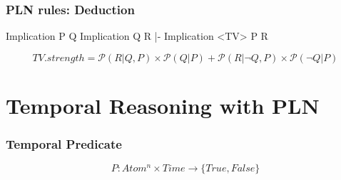\documentclass[aspectratio=169]{beamer}
\begin{document}
\begin{frame}[fragile]

  \frametitle{PLN rules: Deduction}
\begin{semiverbatim}
Implication
  P
  Q
Implication
  Q
  R
|-
Implication <TV>
  P
  R
\end{semiverbatim}
$$TV.strength = \mathcal{P}(R|Q,P)\times\mathcal{P}(Q|P) + \mathcal{P}(R|¬Q,P)\times\mathcal{P}(¬Q|P)$$
\end{frame}

\section {Temporal Reasoning with PLN}

\begin{frame}
  \frametitle{Temporal Predicate}
  $$P: Atom^n \times Time \rightarrow \{True, False\}$$

\end{frame}
\end{document}
